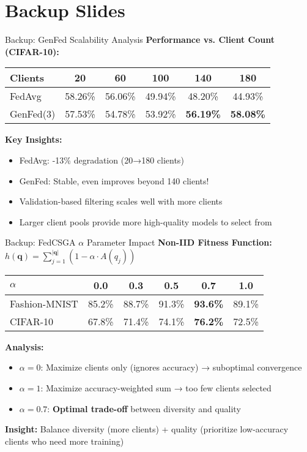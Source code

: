 \documentclass{beamer}
\begin{document}
\appendix

\section*{Backup Slides}

\begin{frame}{Backup: GenFed Scalability Analysis}
\textbf{Performance vs. Client Count (CIFAR-10):}
\begin{table}
\centering
\footnotesize
\begin{tabular}{|l|c|c|c|c|c|}
\hline
\textbf{Clients} & \textbf{20} & \textbf{60} & \textbf{100} & \textbf{140} & \textbf{180} \\
\hline
FedAvg & 58.26\% & 56.06\% & 49.94\% & 48.20\% & 44.93\% \\
GenFed(3) & 57.53\% & 54.78\% & 53.92\% & \textbf{56.19\%} & \textbf{58.08\%} \\
\hline
\end{tabular}
\end{table}

\textbf{Key Insights:}
\begin{itemize}
\item FedAvg: -13\% degradation (20→180 clients)
\item GenFed: Stable, even improves beyond 140 clients!
\item Validation-based filtering scales well with more clients
\item Larger client pools provide more high-quality models to select from
\end{itemize}
\end{frame}

\begin{frame}{Backup: FedCSGA $\alpha$ Parameter Impact}
\textbf{Non-IID Fitness Function:} $h(\mathbf{q}) = \sum_{j=1}^{|\mathbf{q}|} (1 - \alpha \cdot A(q_j))$

\begin{table}
\centering
\footnotesize
\begin{tabular}{|l|c|c|c|c|c|}
\hline
$\alpha$ & 0.0 & 0.3 & 0.5 & 0.7 & 1.0 \\
\hline
Fashion-MNIST & 85.2\% & 88.7\% & 91.3\% & \textbf{93.6\%} & 89.1\% \\
CIFAR-10 & 67.8\% & 71.4\% & 74.1\% & \textbf{76.2\%} & 72.5\% \\
\hline
\end{tabular}
\end{table}

\textbf{Analysis:}
\begin{itemize}
\item $\alpha=0$: Maximize clients only (ignores accuracy) → suboptimal convergence
\item $\alpha=1$: Maximize accuracy-weighted sum → too few clients selected
\item $\alpha=0.7$: \textbf{Optimal trade-off} between diversity and quality
\end{itemize}

\textbf{Insight:} Balance diversity (more clients) + quality (prioritize low-accuracy clients who need more training)
\end{frame}
\end{document}

